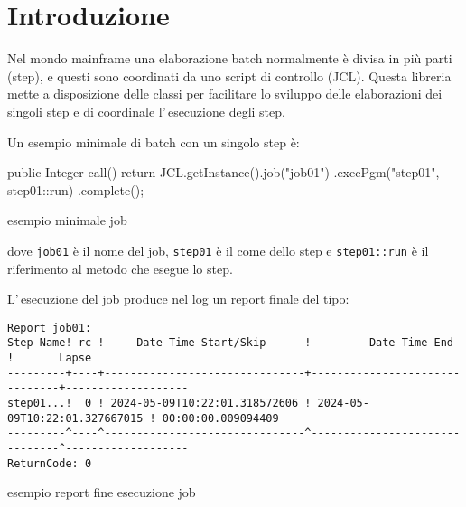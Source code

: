\section*{Introduzione}
Nel mondo mainframe una elaborazione batch normalmente è divisa in più parti
(step), e questi sono coordinati da uno script di controllo (JCL).
Questa libreria mette a disposizione delle classi per facilitare lo sviluppo
delle elaborazioni dei singoli step e di coordinale l'\,esecuzione degli step.

Un esempio minimale di batch con un singolo step è:
\begin{elisting}[!htb]
\begin{javacode}
public Integer call() {
    return JCL.getInstance().job("job01")
        .execPgm("step01", step01::run)
        .complete();
}
\end{javacode}
\caption{esempio minimale job}
\label{lst:demoJob}
\end{elisting}
dove \texttt{job01} è il nome del job, \texttt{step01} è il come dello step e
\texttt{step01::run} è il riferimento al metodo che esegue lo step.

L'\,esecuzione del job produce nel log un report finale del tipo:
\begin{elisting}[!htb]
\begin{Verbatim}[fontsize=\small,frame=single]
Report job01:
Step Name! rc !     Date-Time Start/Skip      !         Date-Time End         !       Lapse
---------+----+-------------------------------+-------------------------------+-------------------
step01...!  0 ! 2024-05-09T10:22:01.318572606 ! 2024-05-09T10:22:01.327667015 ! 00:00:00.009094409
---------^----^-------------------------------^-------------------------------^-------------------
ReturnCode: 0
\end{Verbatim}
\caption{esempio report fine esecuzione job}
\label{lst:demoLog}
\end{elisting}
